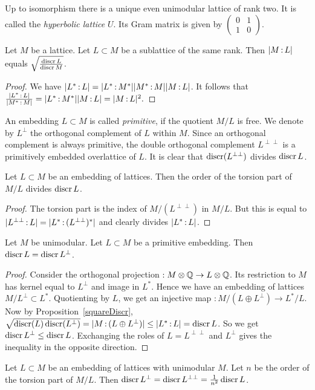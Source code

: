 \begin{example}
Up to isomorphism there is a unique even unimodular lattice of rank two. It is called the \emph{hyperbolic lattice} $U$. Its Gram matrix is given by 
$\left(\begin{smallmatrix} 0&1\\ 1&0 \end{smallmatrix}\right)$.
\end{example}
\begin{proposition} \label{squareDiscr}Let $M$ be a lattice. Let $L\subset M$ be a sublattice of the same rank. Then $|M\,{:}\, L|$ equals $\sqrt{\frac{\operatorname{discr} L}{\operatorname{discr} M}}$.
\end{proposition}
\begin{proof}
We have $|L^*\,{:}\, L|=\allowbreak |L^*\,{:}\, M^*||M^*\,{:}\, M||M\,{:}\, L|$. It follows that
$\frac{|L^*\,{:}\, L|}{|M^*\,{:}\, M|}=\allowbreak |L^*\,{:}\, M^*||M\,{:}\, L|=\allowbreak |M\,{:}\, L|^2.$
\end{proof}
An embedding $L\subset M$ is called \emph{primitive}, if the quotient $M/L$ is free. We denote by $L^\perp$ the orthogonal complement of $L$ within $M$. Since an orthogonal complement is always primitive, the double orthogonal complement $ L^{\perp\perp}$ is a primitively embedded overlattice of $L$. It is clear that $\operatorname{discr}( L^{\perp\perp})$ divides $\operatorname{discr} L$. 
\begin{proposition}\label{TorsionQuotient} Let $L\subset M$ be an embedding of lattices. Then the order of the torsion part of $M/L$ 
divides $\operatorname{discr} L$.
\end{proposition}
\begin{proof}
The torsion part is the index of $M/( L^{\perp\perp})$ in $M/L$. But this is equal to $|L^{\perp\perp}\,{:}\, L| = |L^* \,{:}\, (L^{\perp\perp})^*|$ and clearly divides $|L^*\,{:}\, L|$.
\end{proof}
\begin{proposition}\label{discrOrthPrim}
Let $M$ be unimodular. Let $L\subset M$ be a primitive embedding. Then $\operatorname{discr} L = \operatorname{discr} L^\perp$.
\end{proposition}
\begin{proof}
Consider the orthogonal projection $ : M\otimes\mathbb{Q} \rightarrow L\otimes \mathbb{Q}$. Its restriction to $M$ has kernel equal to $L^\perp$ and image in $L^*$. Hence we have an embedding of lattices $M/L^\perp \subset L^*$. Quotienting by $L$, we get an injective map $: M/(L\oplus L^\perp) \rightarrow L^*/L$. 
Now by Proposition~\ref{squareDiscr}, $\sqrt{\operatorname{discr}(L) \operatorname{discr} (L^\perp)} =|M \,{:}\, (L\oplus L^\perp)| \leq |L^*\,{:}\, L| = \operatorname{discr} L$. So we get $\operatorname{discr} L^\perp \leq \operatorname{discr} L$. Exchanging the roles of $L=L^{\perp\perp}$ and $L^\perp$ gives the inequality in the opposite direction.
\end{proof}
\begin{corollary}\label{latticeCor}
Let $L\subset M$ be an embedding of lattices with unimodular $M$. Let $n$ be the order of the torsion part of $M/L$. Then $\operatorname{discr} L^\perp =\operatorname{discr} L^{\perp\perp} = \frac{1}{n^2}\operatorname{discr} L$.
\end{corollary}

